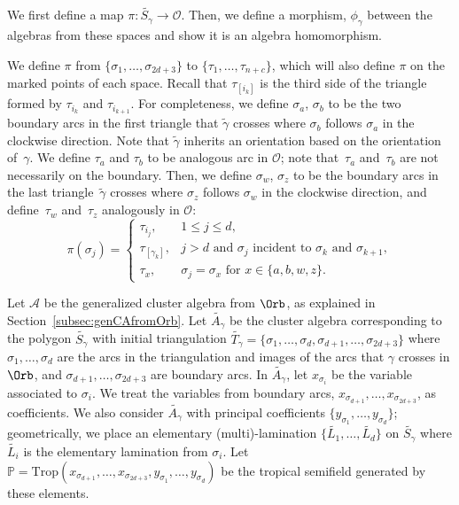 We first define a map $\pi\colon \widetilde{S_\gamma} \to \mathcal{O}$. Then, we define a morphism, $\phi_\gamma$ between the algebras from these spaces and show it is an algebra homomorphism.

We define $\pi$ from $\{\sigma_1,\ldots, \sigma_{2d +3}\}$ to $\{\tau_1,\ldots, \tau_{n+c}\}$, which will also define $\pi$ on the marked points of each space. Recall that $\tau_{[i_k]}$ is the third side of the triangle formed by $\tau_{i_k}$ and $\tau_{i_{k+1}}$. For completeness, we define $\sigma_a$, $\sigma_b$ to be the two boundary arcs in the first triangle that $\widetilde{\gamma}$ crosses where $\sigma_b$ follows $\sigma_a$ in the clockwise direction. Note that $\widetilde{\gamma}$ inherits an orientation based on the orientation of~$\gamma$. We define $\tau_a$ and $\tau_b$ to be analogous arc in $\mathcal{O}$; note that~$\tau_a$ and~$\tau_b$ are not necessarily on the boundary. Then, we define $\sigma_w$, $\sigma_z$ to be the boundary arcs in the last triangle~$\widetilde{\gamma}$ crosses where $\sigma_z$ follows $\sigma_w$ in the clockwise direction, and define~$\tau_w$ and~$\tau_z$ analogously in $\mathcal{O}$:
\[
\pi(\sigma_j) = \begin{cases} \tau_{i_j}, & 1 \leq j \leq d, \\ \tau_{[\gamma_k]}, & j > d \text{ and } \sigma_j \text{ incident to } \sigma_k \text{ and } \sigma_{k+1}, \\
\tau_{x}, & \sigma_j = \sigma_x \text{ for } x \in \{a,b,w,z\}. \end{cases}
\]

Let $\mathcal{A}$ be the generalized cluster algebra from $\Orb$, as explained in Section~\ref{subsec:genCAfromOrb}. Let $\widetilde{A_\gamma}$ be the cluster algebra corresponding to the polygon $\widetilde{S_\gamma}$ with initial triangulation $\widetilde{T_\gamma} = \{\sigma_1,\ldots, \sigma_d,\sigma_{d+1},\allowbreak \ldots, \sigma_{2d + 3}\}$ where $\sigma_1,\ldots, \sigma_d$ are the arcs in the triangulation and images of the arcs that $\gamma$ crosses in $\Orb$, and $\sigma_{d+1},\ldots, \sigma_{2d + 3}$ are boundary arcs.
In $\widetilde{A_\gamma}$, let $x_{\sigma_i}$ be the variable associated to $\sigma_i$. We treat the variables from boundary arcs, $x_{\sigma_{d+1}},\ldots, x_{\sigma_{2d+3}}$, as coefficients. We also consider $\widetilde{A_\gamma}$ with principal coefficients $\{y_{\sigma_1},\ldots, y_{\sigma_d}\}$; geometrically, we place an elementary (multi)-lamination $\big\{\widetilde{L_1},\ldots, \widetilde{L_d}\big\}$ on $\widetilde{S_\gamma}$ where $\widetilde{L_i}$ is the elementary lamination from $\sigma_i$.
 Let $\mathbb{P} = \text{Trop}(x_{\sigma_{d+1}},\ldots,x_{\sigma_{2d+3}}, y_{\sigma_1},\ldots, y_{\sigma_d})$ be the tropical semifield generated by these elements.

